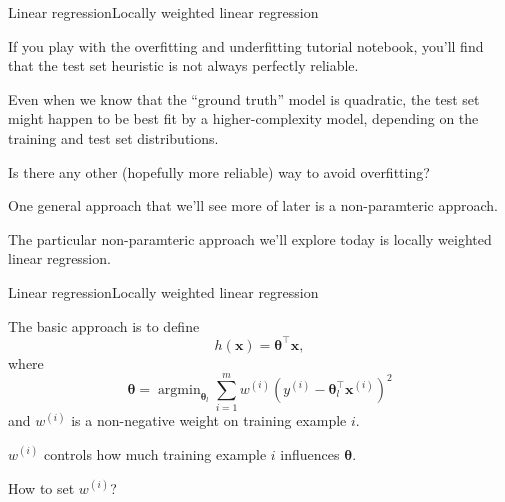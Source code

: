 \documentclass{beamer}
\renewcommand{\vec}[1]{\boldsymbol{#1}}
\DeclareMathOperator*{\argmin}{argmin}
\begin{document}
\begin{frame}{Linear regression}{Locally weighted linear regression}

  If you play with the overfitting and underfitting tutorial notebook,
  you'll find that the test set heuristic is not always perfectly reliable.

  \medskip

  Even when we know that the ``ground truth'' model is quadratic, the
  test set might happen to be best fit by a higher-complexity model,
  depending on the training and test set distributions.

  \medskip

  Is there any other (hopefully more reliable) way to avoid
  overfitting?

  \medskip

  One general approach that we'll see more of later is
  a \alert{non-paramteric} approach.

  \medskip

  The particular non-paramteric approach we'll explore today is
  \alert{locally weighted linear regression}.

\end{frame}


\begin{frame}{Linear regression}{Locally weighted linear regression}

  The basic approach is to define
  \[ h(\vec{x}) = \vec{\theta}^\top \vec{x}, \]
  where
  \[ \vec{\theta} = \argmin_{\vec{\theta}_l} \sum_{i=1}^m w^{(i)} (y^{(i)}-\vec{\theta}_l^\top \vec{x}^{(i)})^2 \]
  and $w^{(i)}$ is a non-negative \alert{weight} on training example
  $i$.

  \medskip

  $w^{(i)}$ controls how much training example $i$ influences $\vec{\theta}$.

  \medskip

  How to set $w^{(i)}$?
  
\end{frame}
\end{document}
